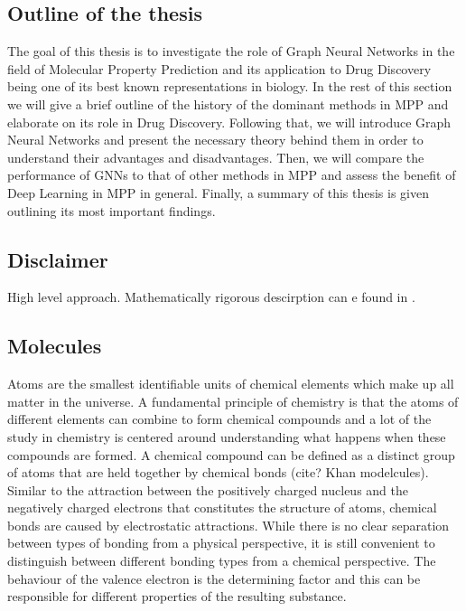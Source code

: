 \subsection{Outline of the thesis}
The goal of this thesis is to investigate the role of Graph Neural Networks in the field of Molecular Property Prediction and its application to Drug Discovery being one of its best known representations in biology. In the rest of this section we will give a brief outline of the history of the dominant methods in MPP and elaborate on its role in Drug Discovery. Following that, we will introduce Graph Neural Networks and present the necessary theory behind them in order to understand their advantages and disadvantages. Then, we will compare the performance of GNNs to that of other methods in MPP and assess the benefit of Deep Learning in MPP in general. Finally, a summary of this thesis is given outlining its most important findings. 
\subsection{Disclaimer}
High level approach. Mathematically rigorous descirption can e found in \cite{KerberAdalbert2014Mcac}.




\subsection{Molecules}
Atoms are the smallest identifiable units of chemical elements which make up all matter in the universe. A fundamental principle of chemistry is that the atoms of different elements can combine to form chemical compounds and a lot of the study in chemistry is centered around understanding what happens when these compounds are formed. A chemical compound can be defined as a distinct group of atoms that are held together by chemical bonds (cite? Khan modelcules). Similar to the attraction between the positively charged nucleus and the negatively charged electrons that constitutes the structure of atoms, chemical bonds are caused by electrostatic attractions. While there is no clear separation between types of bonding from a physical perspective, it is still convenient to distinguish between different bonding types from a chemical perspective. The behaviour of the valence electron is the determining factor and this can be responsible for different properties of the resulting substance.

